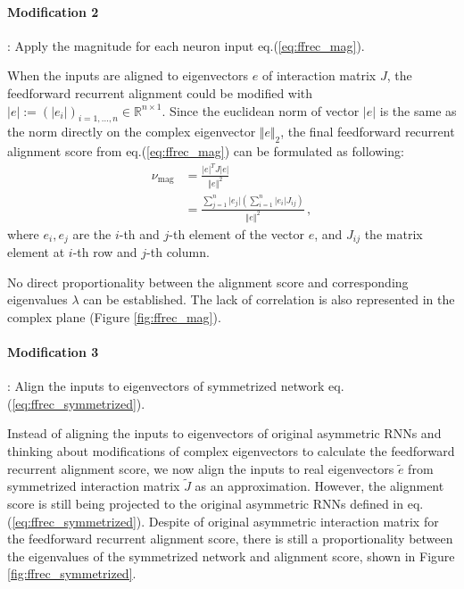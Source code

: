 \documentclass[11pt]{article}
\begin{document}
	\paragraph{Modification 2}: Apply the magnitude for each neuron input eq.(\ref{eq:ffrec_mag}).
	
	When the inputs are aligned to eigenvectors $e$ of interaction matrix $J$, the feedforward recurrent alignment could be modified with $\vert e \vert := (\vert e_{i} \vert)_{i = 1, ..., n} \in \mathbb{R}^{n \times 1}$. Since the euclidean norm of vector $\vert e \vert$ is the same as the norm directly on the complex eigenvector $\Vert e \Vert_2$, the final feedforward recurrent alignment score from eq.(\ref{eq:ffrec_mag}) can be formulated as following:
		\begin{equation}
			\begin{split}
				\nu_{\text{mag}} & = \frac{\vert e \vert^T J \vert e \vert}{\Vert e \Vert^2} \\
				& = \frac{\sum_{j=1}^{n} \vert e_{j} \vert \left( \sum_{i = 1}^{n} \vert e_{i} \vert J_{ij} \right)}{\Vert e \Vert^2} \, ,
			\end{split}
		\end{equation}
	where $e_i, e_j$ are the $i$-th and $j$-th element of the vector $e$, and $J_{ij}$ the matrix element at $i$-th row and $j$-th column. 
	
	No direct proportionality between the alignment score and corresponding eigenvalues $\lambda$ can be established. The lack of correlation is also represented in the complex plane (Figure \ref{fig:ffrec_mag}). 
	\vspace{1cm}
	\paragraph{Modification 3}: Align the inputs to eigenvectors of symmetrized network eq.(\ref{eq:ffrec_symmetrized}).
	
	Instead of aligning the inputs to eigenvectors of original asymmetric RNNs and thinking about modifications of complex eigenvectors to calculate the feedforward recurrent alignment score, we now align the inputs to real eigenvectors $\tilde{e}$ from symmetrized interaction matrix $\tilde{J}$ as an approximation. However, the alignment score is still being projected to the original asymmetric RNNs defined in eq.(\ref{eq:ffrec_symmetrized}). 
	Despite of original asymmetric interaction matrix for the feedforward recurrent alignment score, there is still a proportionality between the eigenvalues of the symmetrized network and alignment score, shown in Figure \ref{fig:ffrec_symmetrized}. 
	
\end{document}
